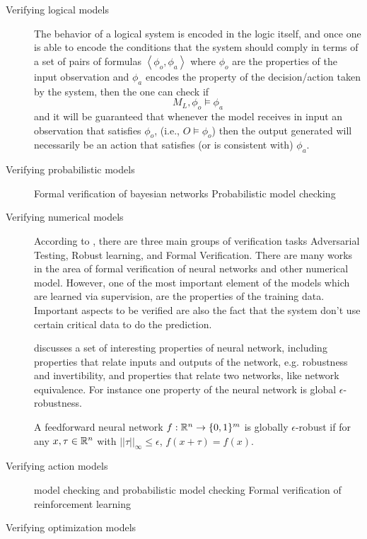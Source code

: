  \begin{description}
 \item[Verifying logical models] The behavior of a logical system is
   encoded in the logic itself, and once one is able to encode the
   conditions that the system should comply in terms of a set of pairs
   of formulas $\left<\phi_o,\phi_a\right>$ where $\phi_o$ are the
   properties of the input observation and $\phi_a$ encodes the
   property of the decision/action taken by the system, then the one
   can check if 
   $$
   M_L, \phi_o \models \phi_a
   $$
   and it will be guaranteed that whenever the model receives in input
   an observation that satisfies $\phi_o$, (i.e., $O\models \phi_o$)
   then the output generated will necessarily be an action that
   satisfies (or is consistent with) $\phi_a$.
   
 \item[Verifying probabilistic models]
   Formal verification of bayesian networks \cite{pmlr-v72-shih18a}
   Probabilistic model checking \cite{kwiatkowska2018probabilistic}

 \item[Verifying numerical models] According to
   \cite{kohli2019towards}, there are three main groups of
   verification tasks Adversarial Testing, Robust learning, and Formal
   Verification. There are many works in the area of formal
   verification of neural networks and other numerical model.
   However, one of the most important element of the models which are
   learned via supervision, are the properties of the training data.
   Important aspects to be verified are also the fact that the system
   don't use certain critical data to do the prediction.

   \cite{narodytska2018formal} discusses a set of interesting
   properties of neural network, including properties that relate
   inputs and outputs of the network, e.g. robustness and
   invertibility, and properties that relate two networks, like
   network equivalence. For instance one property of the neural
   network is global $\epsilon$-robustness. 

   A feedforward neural network $f:\mathbb{R}^n\rightarrow \{0,1\}^m$ is
   globally $\epsilon$-robust if for any $x,\tau\in\mathbb{R}^n$ with
   $||\tau||_{\infty} \leq \epsilon$, $f(x+\tau)=f(x)$. 
   
 \item[Verifying action models]
   model checking \cite{clarke2018introduction} and
   probabilistic model checking \cite{kwiatkowska2018probabilistic}
   Formal verification of reinforcement learning
   \cite{van2017challenges}
   
 \item[Verifying optimization models]
   
\end{description}

